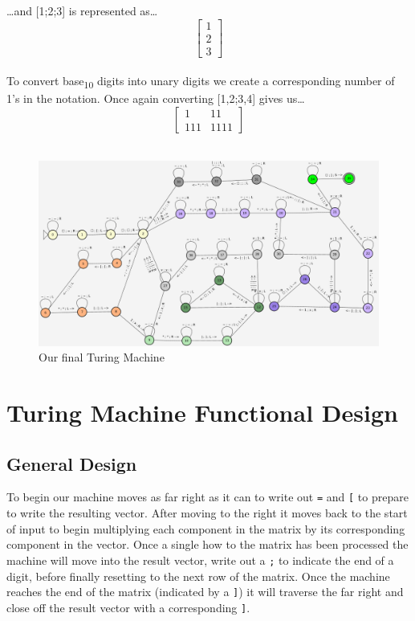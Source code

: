\documentclass[letterpaper, 11pt]{article}
\begin{document}
\ldots{}and [1;2;3] is represented as\ldots{}\\
\[\begin{bmatrix}1\\2\\3\end{bmatrix}\]\\

To convert base\textsubscript{10} digits into unary digits we create a corresponding number of 1's in the notation. Once again converting [1,2;3,4] gives us\ldots{}\\
\[\begin{bmatrix}1&11\\111&1111\end{bmatrix}\]\\

\begin{figure}[htbp]
\centering
\includegraphics[width=5.5in]{2024-11-17_11-25.png}
\caption{Our final Turing Machine}
\end{figure}
\section{Turing Machine Functional Design}
\label{sec:org29868da}
\subsection{General Design}
\label{sec:org360a22c}
To begin our machine moves as far right as it can to write out \texttt{=} and \texttt{[} to prepare to write the resulting vector. After moving to the right it moves back to the start of input to begin multiplying each component in the matrix by its corresponding component in the vector. Once a single how to the matrix has been processed the machine will move into the result vector, write out a \texttt{;} to indicate the end of a digit, before finally resetting to the next row of the matrix. Once the machine reaches the end of the matrix (indicated by a \texttt{]}) it will traverse the far right and close off the result vector with a corresponding \texttt{]}.\\
\end{document}
